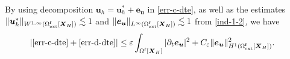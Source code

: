 \documentclass[11pt,reqno]{amsart}
\theoremstyle{definition}
\theoremstyle{plain}
\numberwithin{theorem}{section}
\numberwithin{proposition}{section}
\numberwithin{lemma}{section}
\numberwithin{equation}{section}
\newcommand{\bs}[1]{\boldsymbol{#1}}
\def\d{\mathrm{d}}
\renewcommand{\(}{\bigl(}
\renewcommand{\)}{\bigr)}
\begin{document}
By using decomposition ${\bs u}_h={\bs u}_h^*+{\bs e}_{\bs u}$ in \eqref{err-c-dte}, as well as the estimates $\|{\bs u}_h^*\|_{W^{1,\infty}(\Omega^{\rm f}_{\rm ext}[{\bs X}_H])}\lesssim 1$ and $\|{\bs e}_{\bs u}\|_{L^\infty(\Omega^{\rm f}_{\rm ext}[{\bs X}_H])}\lesssim 1$ from \eqref{ind-1-2}, we have 
\begin{align}\label{dte-estimates-cdf}
| \eqref{err-c-dte} + \eqref{err-d-dte} | 
&\le \varepsilon \int_{\Omega^{\rm f}[\bs X_H]} |\partial_t {\bs e}_{\bs u} |^2 + C_{\varepsilon} \|{\bs e}_{\bs u}\|_{H^1(\Omega^{\rm f}_{\rm ext}[{\bs X}_H])}^2 .
\end{align}
\end{document}
